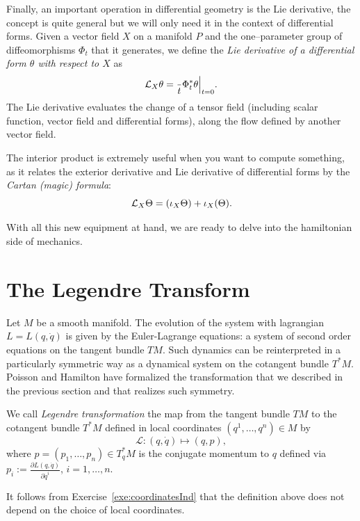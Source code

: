 \documentclass[english,fontsize=11pt,paper=a5,oneside]{scrbook}
\newcommand{\cL}{\mathcal{L}}
\let\d\relax
\newcommand{\d}{\mathrm{d}}
\theoremstyle{definition}
\begin{document}
Finally, an important operation in differential geometry is the Lie derivative, the concept is quite general but we will only need it in the context of differential forms.
Given a vector field $X$ on a manifold $P$ and the one--parameter group of diffeomorphisms $\Phi_t$ that it generates, we define the \emph{Lie derivative of a differential form $\theta$ with respect to $X$} as
\begin{equation}\label{eq:lie-derivative}
  \cL_X \theta = \frac{\d}{\d t}\Phi_t^*\theta \Big|_{t=0}.
\end{equation}
The Lie derivative evaluates the change of a tensor field (including scalar function, vector field and differential forms), along the flow defined by another vector field.

The interior product is extremely useful when you want to compute something, as it relates the exterior derivative and Lie derivative of differential forms by the \emph{Cartan (magic) formula}:
\begin{equation}\label{eq:cartan}
  \cL_X \Theta = \d(\iota_X \Theta) + \iota_X (\d\Theta).
\end{equation}

With all this new equipment at hand, we are ready to delve into the hamiltonian side of mechanics.

\section{The Legendre Transform}

Let $M$ be a smooth manifold.
The evolution of the system with lagrangian $L=L(q,\dot q)$ is given by the Euler-Lagrange equations: a system of second order equations on the tangent bundle $TM$.
Such dynamics can be reinterpreted in a particularly symmetric way as a dynamical system on the cotangent bundle $T^*M$.
Poisson and Hamilton have formalized the transformation that we described in the previous section and that realizes such symmetry.

\begin{tcolorbox}
  We call \emph{Legendre transformation} the map from the tangent bundle $TM$ to the cotangent bundle $T^*M$ defined in local coordinates $(q^1, \ldots, q^n)\in M$ by
  \begin{equation}\label{eq:legrendreTrafo}
    \cL: (q,\dot q) \mapsto (q,p),
  \end{equation}
  where $p = (p_1, \ldots, p_n) \in T^*_q M$ is the conjugate momentum to $q$ defined via $p_i := \frac{\partial L(q,\dot q)}{\partial \dot q^i}$, $i=1,\ldots,n$.
\end{tcolorbox}
It follows from Exercise~\ref{exe:coordinatesInd} that the definition above does not depend on the choice of local coordinates.
\end{document}
